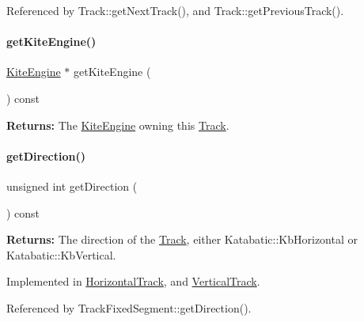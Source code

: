Referenced by Track\+::get\+Next\+Track(), and Track\+::get\+Previous\+Track().

\mbox{\label{classKite_1_1Track_af7373bd3a4ee8fcf28a316230ed37fc0}} 
\paragraph{\texorpdfstring{get\+Kite\+Engine()}{getKiteEngine()}}
{\footnotesize\ttfamily \mbox{\hyperlink{classKite_1_1KiteEngine}{Kite\+Engine}} $\ast$ get\+Kite\+Engine (\begin{DoxyParamCaption}{ }\end{DoxyParamCaption}) const}

{\bfseries Returns\+:} The \mbox{\hyperlink{classKite_1_1KiteEngine}{Kite\+Engine}} owning this \mbox{\hyperlink{classKite_1_1Track}{Track}}. \mbox{\label{classKite_1_1Track_ae35b78590ed6aa546b626ef95f28c533}} 
\paragraph{\texorpdfstring{get\+Direction()}{getDirection()}}
{\footnotesize\ttfamily unsigned int get\+Direction (\begin{DoxyParamCaption}{ }\end{DoxyParamCaption}) const\hspace{0.3cm}{\ttfamily [pure virtual]}}

{\bfseries Returns\+:} The direction of the \mbox{\hyperlink{classKite_1_1Track}{Track}}, either Katabatic\+::\+Kb\+Horizontal or Katabatic\+::\+Kb\+Vertical. 

Implemented in \mbox{\hyperlink{classKite_1_1HorizontalTrack_a0dd7cf705ace42c662c289955313b2e9}{Horizontal\+Track}}, and \mbox{\hyperlink{classKite_1_1VerticalTrack_a0dd7cf705ace42c662c289955313b2e9}{Vertical\+Track}}.



Referenced by Track\+Fixed\+Segment\+::get\+Direction().

\mbox{\label{classKite_1_1Track_ac6f0fd2129f44fe6c0c6eaca9766e1a3}} 

